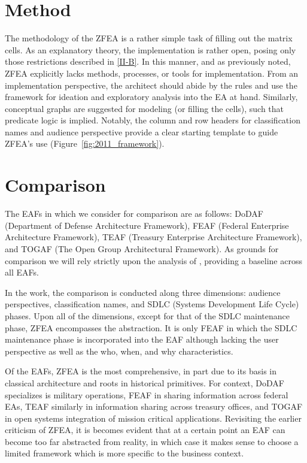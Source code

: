 \documentclass[12pt,conference]{IEEEtran}
\begin{document}
\section{Method}
The methodology of the ZFEA is a rather simple task of filling out the matrix cells.
As an explanatory theory, the implementation is rather open, posing only those restrictions described in \ref{II-B}.
In this manner, and as previously noted, ZFEA explicitly lacks methods, processes, or tools for implementation.
From an implementation perspective, the architect should abide by the rules and use the framework for ideation and exploratory analysis into the EA at hand.
Similarly, conceptual graphs are suggested for modeling (or filling the cells), such that predicate logic is implied.
Notably, the column and row headers for classification names and audience perspective provide a clear starting template to guide ZFEA's use (Figure~\ref{fig:2011_framework}).

\section{Comparison}
The EAFs in which we consider for comparison are as follows: DoDAF (Department of Defense Architecture Framework), FEAF (Federal Enterprise Architecture Framework), TEAF (Treasury Enterprise Architecture Framework), and TOGAF (The Open Group Architectural Framework).
As grounds for comparison we will rely strictly upon the analysis of \cite{soa_comparison}, providing a baseline across all EAFs.

In the work, the comparison is conducted along three dimensions: audience perspectives, classification names, and SDLC (Systems Development Life Cycle) phases.
Upon all of the dimensions, except for that of the SDLC maintenance phase, ZFEA encompasses the abstraction.
It is only FEAF in which the SDLC maintenance phase is incorporated into the EAF although lacking the user perspective as well as the who, when, and why characteristics.

Of the EAFs, ZFEA is the most comprehensive, in part due to its basis in classical architecture and roots in historical primitives.
For context, DoDAF specializes is military operations, FEAF in sharing information across federal EAs, TEAF similarly in information sharing across treasury offices, and TOGAF in open systems integration of mission critical applications.
Revisiting the earlier criticism of ZFEA, it is becomes evident that at a certain point an EAF can become too far abstracted from reality, in which case it makes sense to choose a limited framework which is more specific to the business context.
\end{document}
